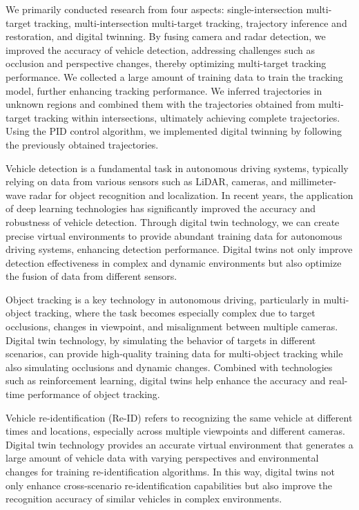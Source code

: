 We primarily conducted research from four aspects: single-intersection multi-target tracking, multi-intersection multi-target tracking, trajectory inference and restoration, and digital twinning. 
By fusing camera and radar detection, we improved the accuracy of vehicle detection, addressing challenges such as occlusion and perspective changes, thereby optimizing multi-target tracking performance. 
We collected a large amount of training data to train the tracking model, further enhancing tracking performance. 
We inferred trajectories in unknown regions and combined them with the trajectories obtained from multi-target tracking within intersections, ultimately achieving complete trajectories. 
Using the PID control algorithm, we implemented digital twinning by following the previously obtained trajectories.

Vehicle detection is a fundamental task in autonomous driving systems, typically relying on data from various sensors such as LiDAR, cameras, and millimeter-wave radar for object recognition and localization. 
In recent years, the application of deep learning technologies has significantly improved the accuracy and robustness of vehicle detection. 
Through digital twin technology, we can create precise virtual environments to provide abundant training data for autonomous driving systems, enhancing detection performance. 
Digital twins not only improve detection effectiveness in complex and dynamic environments but also optimize the fusion of data from different sensors\cite{Alpher20}.

Object tracking is a key technology in autonomous driving, particularly in multi-object tracking, where the task becomes especially complex due to target occlusions, changes in viewpoint, and misalignment between multiple cameras. 
Digital twin technology, by simulating the behavior of targets in different scenarios, can provide high-quality training data for multi-object tracking while also simulating occlusions and dynamic changes. 
Combined with technologies such as reinforcement learning, digital twins help enhance the accuracy and real-time performance of object tracking\cite{Alpher22b}.

Vehicle re-identification (Re-ID) refers to recognizing the same vehicle at different times and locations, especially across multiple viewpoints and different cameras. 
Digital twin technology provides an accurate virtual environment that generates a large amount of vehicle data with varying perspectives and environmental changes for training re-identification algorithms. 
In this way, digital twins not only enhance cross-scenario re-identification capabilities but also improve the recognition accuracy of similar vehicles in complex environments\cite{Alpher23}.

